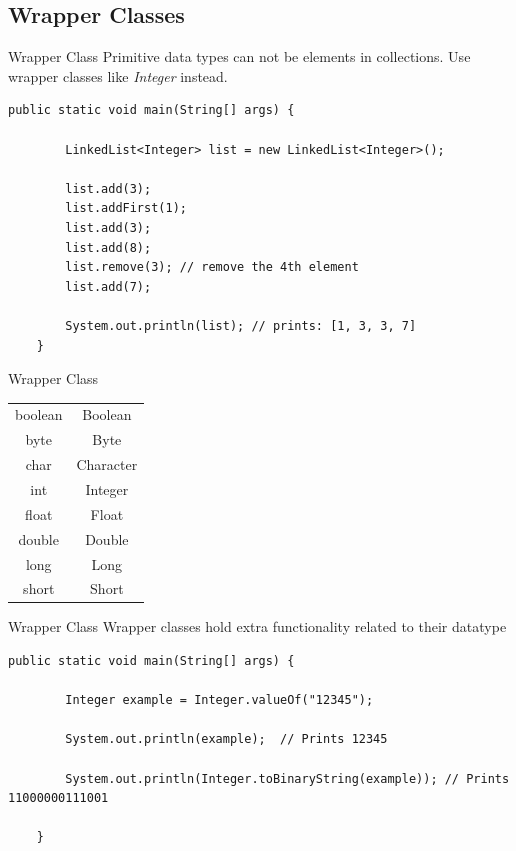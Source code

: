 \subsection{Wrapper Classes}

\begin{frame}[fragile]{Wrapper Class}
	Primitive data types can not be elements in collections. 
	Use wrapper classes like \emph{Integer} instead.
	\begin{lstlisting}[basicstyle=\ttfamily\scriptsize]
	public static void main(String[] args) {
	
	    LinkedList<Integer> list = new LinkedList<Integer>();
	    
	    list.add(3); 
	    list.addFirst(1);
	    list.add(3);
	    list.add(8);
	    list.remove(3); // remove the 4th element
	    list.add(7);
	    
	    System.out.println(list); // prints: [1, 3, 3, 7]
	}
	\end{lstlisting}
\end{frame}

\begin{frame}{Wrapper Class}
	\begin{center}
		\begin{tabular}{ c  c }
			boolean & Boolean \\
			byte & Byte \\
			char & Character \\
			int & Integer \\
			float & Float \\
			double & Double \\
			long & Long \\
			short & Short
		\end{tabular}
	\end{center}
\end{frame}

\begin{frame}[fragile]{Wrapper Class}
	Wrapper classes hold extra functionality related to their datatype
	\begin{lstlisting}[basicstyle=\ttfamily\scriptsize]
	public static void main(String[] args) {
	
	    Integer example = Integer.valueOf("12345");
	    
	    System.out.println(example);  // Prints 12345
	    
	    System.out.println(Integer.toBinaryString(example)); // Prints 11000000111001
	    
	}
	\end{lstlisting}
\end{frame}

